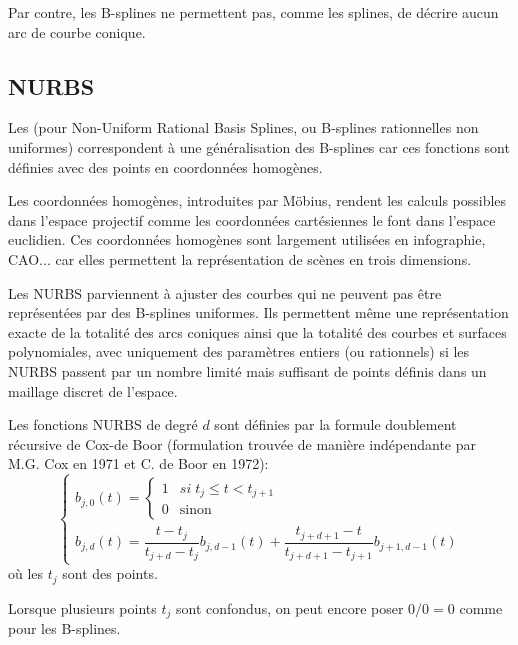 Par contre, les B-splines ne permettent pas, comme les splines, de décrire aucun arc de courbe conique.


\medskip
\subsection{NURBS}

Les  (pour Non-Uniform Rational Basis Splines, ou B-splines rationnelles non 
uniformes) correspondent à une généralisation  des B-splines car ces fonctions sont définies 
avec des points en coordonnées homogènes.

Les coordonnées homogènes, introduites par Möbius, 
rendent les calculs possibles dans l'espace 
projectif comme les coordonnées cartésiennes le font dans l'espace euclidien.
Ces coordonnées homogènes sont largement utilisées en infographie, CAO... car elles permettent
la représentation de scènes en trois dimensions.

Les NURBS parviennent à ajuster des courbes qui ne peuvent pas être représentées par des B-splines 
uniformes. Ils permettent même une représentation exacte de la totalité des arcs coniques
ainsi que la totalité des courbes et surfaces polynomiales, avec uniquement des paramètres entiers 
(ou rationnels) si les NURBS passent par un nombre limité mais suffisant de points définis dans un maillage 
discret de l'espace.

\medskip
Les fonctions NURBS de degré $d$ sont définies par la formule doublement récursive de Cox-de Boor 
(formulation trouvée de manière indépendante par M.G. Cox en 1971 et C. de Boor en 1972):
\begin{equation}
    \left\{\begin{array}{ll}b_{j,0}(t)= \left\{ \begin{array}{ll} 1 & si\; t_j \leq t < t_{j+1} \\ 0 & \text{sinon} \end{array} \right.\\ 
b_{j,d}(t)= \dfrac{t-t_j}{t_{j+d}-t_j} b_{j,d-1}(t)+\dfrac{t_{j+d+1}-t}{t_{j+d+1}-t_{j+1}}b_{j+1,d-1}(t)\end{array}\right.
\end{equation}
où les $t_j$ sont des points.

Lorsque plusieurs points $t_j$ sont confondus, on peut encore poser $0/0=0$ comme pour les B-splines.


